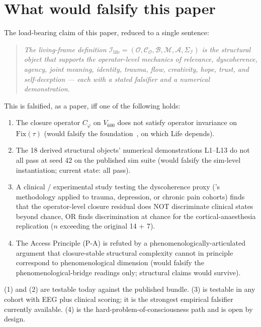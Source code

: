 \documentclass[11pt]{article}
\theoremstyle{plain}
\theoremstyle{definition}
\theoremstyle{remark}
\newcommand{\Fix}{\mathrm{Fix}}
\newcommand{\Ical}{\mathcal{I}}
\newcommand{\Ocal}{\mathcal{O}}
\newcommand{\Ccal}{\mathcal{C}}
\newcommand{\Mcal}{\mathcal{M}}
\newcommand{\Acal}{\mathcal{A}}
\newcommand{\Bcal}{\mathcal{B}}
\newcommand{\Cph}{C_\varphi}
\newcommand{\Ilife}{\Ical_{\mathrm{life}}}
\begin{document}
\section{What would falsify this paper}\label{sec:single-falsifier}

The load-bearing claim of this paper, reduced to a single sentence:

\begin{quote}
\textit{The living-frame definition $\Ilife = (\Ocal, \Ccal_\Ocal, \Bcal, \Mcal, \Acal, \Sigma_\Ical)$ is the structural object that supports the operator-level mechanics of relevance, dyscoherence, agency, joint meaning, identity, trauma, flow, creativity, hope, trust, and self-deception --- each with a stated falsifier and a numerical demonstration.}
\end{quote}

This is falsified, as a paper, iff one of the following holds:

\begin{enumerate}[leftmargin=2em]
\item The closure operator $\Cph$ on $V_{600}$ does not satisfy operator invariance on $\Fix(\tau)$ (would falsify the foundation~\citep{SmartExistenceClosure}, on which Life depends).
\item The 18 derived structural objects' numerical demonstrations L1--L13 do not all pass at seed 42 on the published sim suite (would falsify the sim-level instantiation; current state: all pass).
\item A clinical / experimental study testing the dyscoherence proxy (\citet{SolutionLab002}'s methodology applied to trauma, depression, or chronic pain cohorts) finds that the operator-level closure residual does NOT discriminate clinical states beyond chance, OR finds discrimination at chance for the cortical-anaesthesia replication ($n$ exceeding the original 14 + 7).
\item The Access Principle (P-A) is refuted by a phenomenologically-articulated argument that closure-stable structural complexity cannot in principle correspond to phenomenological dimension (would falsify the phenomenological-bridge readings only; structural claims would survive).
\end{enumerate}

(1) and (2) are testable today against the published bundle. (3) is testable in any cohort with EEG plus clinical scoring; it is the strongest empirical falsifier currently available. (4) is the hard-problem-of-consciousness path and is open by design.
\end{document}
